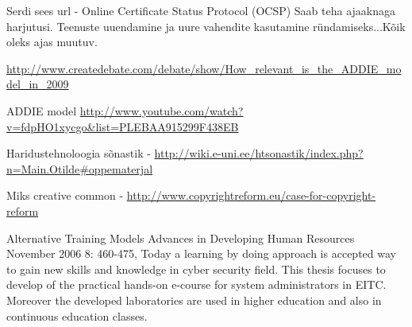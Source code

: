 Serdi sees url -  Online Certificate Status Protocol (OCSP)
Saab teha ajaaknaga harjutusi. Teenuste uuendamine ja uure vahendite kasutamine ründamiseks...Kõik oleks ajas muutuv.

\url{http://www.createdebate.com/debate/show/How_relevant_is_the_ADDIE_model_in_2009}

ADDIE model \url{http://www.youtube.com/watch?v=fdpHO1xycgo&list=PLEBAA915299F438EB}


Haridustehnoloogia sõnastik - \url{http://wiki.e-uni.ee/htsonastik/index.php?n=Main.Otilde#oppematerjal}

Miks creative common - \url{http://www.copyrightreform.eu/case-for-copyright-reform}

Alternative Training Models
Advances in Developing Human Resources November 2006 8: 460-475,
Today a learning by doing approach is accepted way to gain new skills and knowledge in cyber security field. This thesis focuses to develop of the practical hands-on e-course for system administrators in \gls{EITC}. Moreover the developed laboratories are used in higher education and also in continuous education classes.
